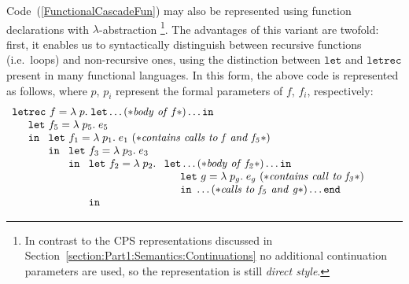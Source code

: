 Code~(\ref{FunctionalCascadeFun}) may also be represented using
function declarations with $\lambda$-abstraction \footnote{In contrast
  to the CPS representations discussed in
  Section~\ref{section:Part1:Semantics:Continuations} no additional
  continuation parameters are used, so the representation is still
  \emph{direct style}.}. The advantages of this variant are twofold:
first, it enables us to syntactically distinguish between recursive
functions (i.e.~loops) and non-recursive ones, using the distinction
between $\mathtt{let}$ and $\mathtt{letrec}$ present in many
functional languages. In this form, the above code is represented as
follows, where $p$, $p_i$ represent the formal parameters of $f$,
$f_i$, respectively:
\begin{equation}
\label{FuntionalCascadeFun}
\begin{array}{l}
  \mathtt{letrec}\ f = \lambda\; p.\;
  \mathtt{let} \ldots (* \mathit{body\ of\ f}*)\ldots \mathtt{in}\\
  \quad \begin{array}{l}
          \mathtt{let}\ f_5 = \lambda\; p_5.\; e_5\\ \mathtt{in}\  
          \begin{array}[t]{l}
            \mathtt{let}\ f_1 = \lambda\;  p_1.\; e_1\ 
                 (* \mathit{contains\ calls\ to\ f\ and\ f_5}*) \\ \mathtt{in}\ 
            \begin{array}[t]{l}
              \mathtt{let}\ f_3 = \lambda\; p_3.\; e_3\\ \mathtt{in}\ 
              \begin{array}[t]{l}
                \mathtt{let}\ f_2 = \lambda\; p_2.\;
                 \begin{array}[t]{l}
                    \mathtt{let} \ldots (* \mathit{body\ of\ f_2}*)\ldots
                      \mathtt{in}\\
                     \quad \begin{array}{l}
                        \mathtt{let}\ g = \lambda\; p_g.\; e_g\
                           (* \mathit{contains\ call\ to\ f_3}*)\\ 
                        \mathtt{in}\   \ldots 
                              (* \mathit{calls\ to\ f_5\ and\ g} *)
                        \ldots \mathtt{end}
                     \end{array}\\
                   \end{array}\\ \mathtt{in}\

\end{array}
\end{array}
\end{array}
\end{array}
\end{array}
\end{equation}
